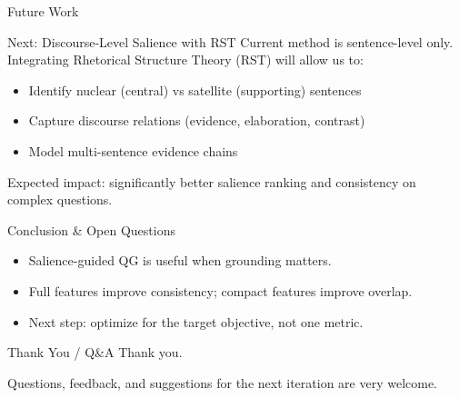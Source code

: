 \documentclass[aspectratio=169]{beamer}
\begin{document}
\begin{frame}{Future Work}
\small
\begin{block}{Next: Discourse-Level Salience with RST}
Current method is sentence-level only.  
Integrating Rhetorical Structure Theory (RST) will allow us to:
\begin{itemize}
  \item Identify nuclear (central) vs satellite (supporting) sentences
  \item Capture discourse relations (evidence, elaboration, contrast)
  \item Model multi-sentence evidence chains
\end{itemize}
\end{block}

Expected impact: significantly better salience ranking and consistency on complex questions.
\end{frame}

\begin{frame}{Conclusion \& Open Questions}
\small
\begin{itemize}
  \item Salience-guided QG is useful when grounding matters.
  \item Full features improve consistency; compact features improve overlap.
  \item Next step: optimize for the target objective, not one metric.
\end{itemize}
\end{frame}

\begin{frame}{Thank You / Q\&A}
\centering
\Large Thank you.

\vspace{1em}
\normalsize
Questions, feedback, and suggestions for the next iteration are very welcome.
\end{frame}
\end{document}
